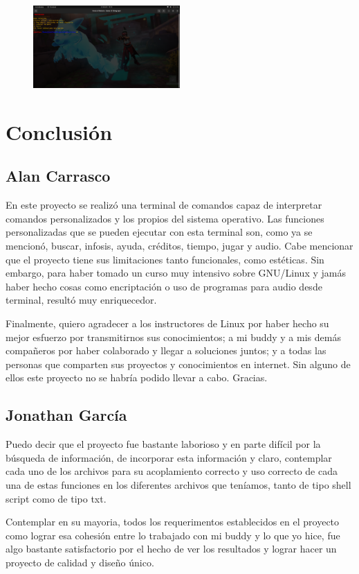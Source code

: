 \documentclass[letterpaper,12pt]{article} %
\begin{document}
\begin{figure}[H]
    \centering
    \includegraphics[width=0.5\textwidth]{figurasShell/Audio10.png}
\end{figure}
\section{Conclusión}

\subsection{Alan Carrasco}

En este proyecto se realizó una terminal de comandos capaz de interpretar comandos personalizados y los propios del sistema operativo. Las funciones personalizadas que se pueden ejecutar con esta terminal son, como ya se mencionó, buscar, infosis, ayuda, créditos, tiempo, jugar y audio. Cabe mencionar que el proyecto tiene sus limitaciones tanto funcionales, como estéticas. Sin embargo, para haber tomado un curso muy intensivo sobre GNU/Linux y jamás haber hecho cosas como encriptación o uso de programas para audio desde terminal, resultó muy enriquecedor.

Finalmente, quiero agradecer a los instructores de Linux por haber hecho su mejor esfuerzo por transmitirnos sus conocimientos; a mi buddy y a mis demás compañeros por haber colaborado y llegar a soluciones juntos; y a todas las personas que comparten sus proyectos y conocimientos en internet. Sin alguno de ellos este proyecto no se habría podido llevar a cabo. Gracias.

\subsection{Jonathan García}

Puedo decir que el proyecto fue bastante laborioso y en parte difícil por la búsqueda de información, de incorporar esta información y claro, contemplar cada uno de los archivos para su acoplamiento correcto y uso correcto de cada una de estas funciones en los diferentes archivos que teníamos, tanto de tipo shell script como de tipo txt.

Contemplar en su mayoria, todos los requerimentos establecidos en el proyecto como lograr esa cohesión entre lo trabajado con mi buddy y lo que yo hice, fue algo bastante satisfactorio por el hecho de ver los resultados y lograr hacer un proyecto de calidad y diseño único. 
\end{document}
